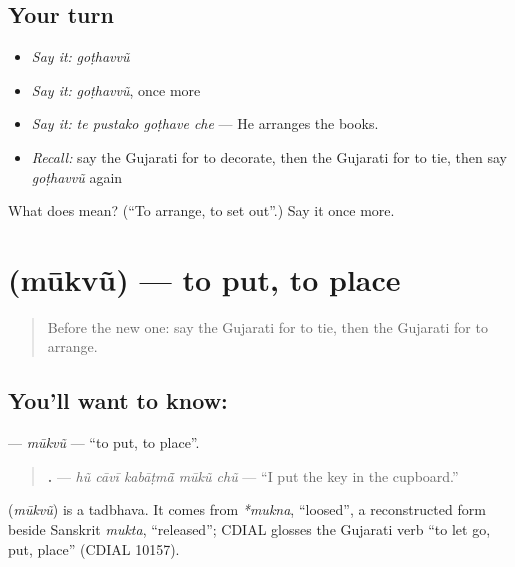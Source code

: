 \subsection*{Your turn}
\begin{itemize}
\raggedright
  \item \emph{Say it:} \emph{goṭhavvũ}
  \item \emph{Say it:} \emph{goṭhavvũ}, once more
  \item \emph{Say it:} \emph{te pustako goṭhave che} — He arranges the books.
  \item \emph{Recall:} say the Gujarati for to decorate, then the Gujarati for to tie, then say \emph{goṭhavvũ} again
\end{itemize}

\begin{tcolorbox}[breakable,colback=teal!4,colframe=teal!35!black,title={Before you move on}]
What does  mean? (\textquotedblleft{}To arrange, to set out\textquotedblright{}.) Say it once more.
\end{tcolorbox}
\section[\texorpdfstring{\gu{મૂકવું} (mūkvũ)}{મૂકવું (mūkvũ)}]{ (mūkvũ) — to put, to place}

\label{lesson:GU-C157-mukvu}



\begin{quote}
Before the new one: say the Gujarati for to tie, then the Gujarati for to arrange.
\end{quote}

\subsection*{You'll want to know: }
\textbf{} — \emph{mūkvũ} — \textquotedblleft{}to put, to place\textquotedblright{}.

\begin{quote}
\textbf{    .} — \emph{hũ cāvī kabāṭmā̃ mūkũ chũ} — \textquotedblleft{}I put the key in the cupboard.\textquotedblright{}
\end{quote}

\begin{cousinweb}
\textbf{} (\emph{mūkvũ}) is a tadbhava. It comes from \emph{*mukna}, \textquotedblleft{}loosed\textquotedblright{}, a reconstructed form beside Sanskrit \emph{mukta}, \textquotedblleft{}released\textquotedblright{}; CDIAL glosses the Gujarati verb \textquotedblleft{}to let go, put, place\textquotedblright{} (CDIAL 10157).
\end{cousinweb}

